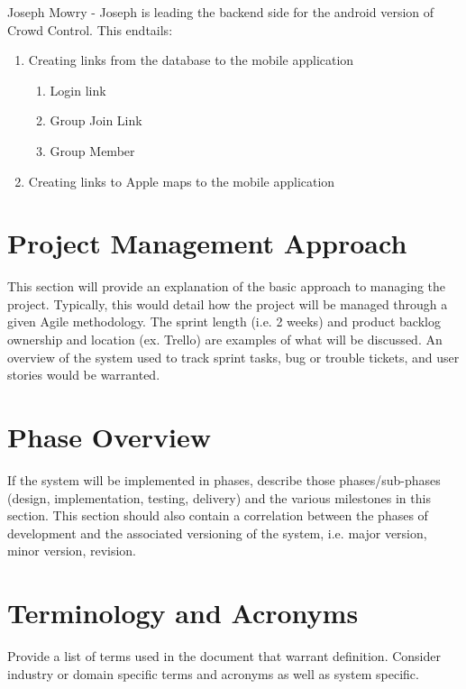Joseph Mowry - Joseph is leading the backend side for the android version of Crowd Control. This endtails:

	\begin{enumerate}
	\item Creating links from the database to the mobile application
		\begin{enumerate}
		\item Login link
		\item Group Join Link
		\item Group Member
		\end{enumerate}
	\item Creating links to Apple maps to the mobile application
	\end{enumerate}

\section{Project  Management Approach}
This section will provide an explanation of the basic approach to managing the 
project.  Typically, this would detail how the project will be managed through 
a given Agile methodology.  The sprint length (i.e. 2 weeks) and product backlog 
ownership and location (ex. Trello) are examples of what will be discussed.  An 
overview of the system used to track sprint tasks, bug or trouble tickets, and 
user stories would be warranted. 


\section{Phase  Overview}


If the system will be implemented in phases, describe those phases/sub-phases (design, 
implementation, testing, delivery) and the various milestones in this section. 
 This section should also contain a correlation between the phases of development 
and the associated versioning of the system, i.e. major version, minor version, 
revision. 

\section{Terminology and Acronyms}
Provide a list of terms used in the document that warrant definition.  Consider 
industry or domain specific terms and acronyms as well as system specific. 
